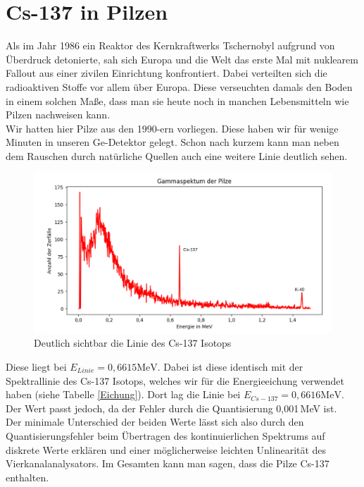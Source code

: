 \section{Cs-137 in Pilzen}

Als im Jahr 1986 ein Reaktor des Kernkraftwerks Tschernobyl aufgrund von Überdruck detonierte, sah sich Europa und die Welt das erste Mal mit 
nuklearem Fallout aus einer zivilen Einrichtung konfrontiert. Dabei verteilten sich die radioaktiven Stoffe vor allem über Europa. Diese verseuchten 
damals den Boden in einem solchen Maße, dass man sie heute noch in manchen Lebensmitteln wie Pilzen nachweisen kann.\\
Wir hatten hier Pilze aus den 1990-ern vorliegen. Diese haben wir für wenige Minuten in unseren Ge-Detektor gelegt. Schon nach kurzem kann man 
neben dem Rauschen durch natürliche Quellen auch eine weitere Linie deutlich sehen.

\begin{figure}[ht]
    \centering
    \includegraphics[width = \linewidth]{Bilder/Auswertung/Pilze.png}
    \caption{Deutlich sichtbar die Linie des Cs-137 Isotops}
\end{figure}

Diese liegt bei $E_{Linie} =0,6615 \mathrm{MeV}$. Dabei ist diese identisch mit der Spektrallinie des Cs-137 Isotops, welches wir für die 
Energieeichung verwendet haben (siehe Tabelle \ref{Eichung}). Dort lag die Linie bei $E_{Cs-137} = 0,6616 \mathrm{MeV}$. Der Wert passt jedoch, da der Fehler durch die Quantisierung 0,001\,MeV ist.\\
Der minimale Unterschied der beiden Werte lässt sich also durch den 
Quantisierungsfehler beim Übertragen des kontinuierlichen Spektrums auf diskrete Werte erklären und einer möglicherweise leichten Unlinearität des Vierkanalanalysators.
Im Gesamten kann man sagen, dass die Pilze Cs-137 enthalten.